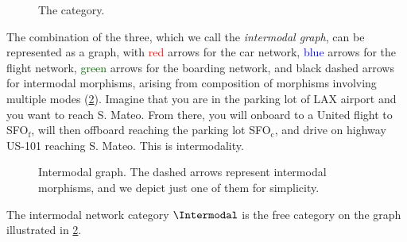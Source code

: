 \begin{example}
  \begin{figure}[h!]
    \begin{center}
    \end{center}
    \caption{The \Board category. }
    \label{fig:boarding}
  \end{figure}

  The combination of the three, which we call the \emph{intermodal graph}, can be represented as a graph, with \textcolor{red}{red} arrows for the car network, \textcolor{blue}{blue} arrows for the flight network, \textcolor{darkgreen}{green} arrows for the boarding network, and black dashed arrows for intermodal morphisms, arising from composition of morphisms involving multiple modes (\cref{fig:intermodal}). Imagine that you are in the parking lot of \textsf{LAX} airport and you want to reach \textsf{S. Mateo}. From there, you will \eg  onboard to a \textsf{United} flight to \textsf{SFO}$_\mathrm{f}$, will then offboard reaching the parking lot \textsf{SFO}$_\mathrm{c}$, and drive on highway \textsf{US-101} reaching \textsf{S. Mateo}. This is intermodality.

  \begin{figure}[h!]
    \begin{center}
      {}
    \end{center}
    \caption{Intermodal graph. The dashed arrows represent intermodal morphisms, and we depict just one of them for simplicity.
    }
    \label{fig:intermodal}
  \end{figure}
\end{example}

The intermodal network category $\Intermodal$ is the free category on the graph illustrated in \cref{fig:intermodal}.

